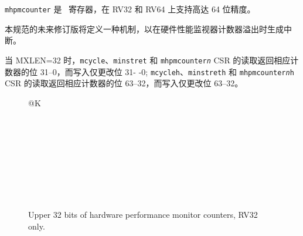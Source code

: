 {\tt mhpmcounter} 是 \warl\ 寄存器，在 RV32 和 RV64 上支持高达 64 位精度。

\iffalse
\begin{commentary}
A future revision of this specification will define a mechanism to generate an
interrupt when a hardware performance monitor counter overflows.
\end{commentary}
\fi

\begin{commentary}
本规范的未来修订版将定义一种机制，以在硬件性能监视器计数器溢出时生成中断。
\end{commentary}

\iffalse
When MXLEN=32, reads of the {\tt mcycle}, {\tt minstret}, and {\tt
mhpmcounter{\em n}} CSRs return bits 31--0 of the corresponding counter, and
writes change only bits 31--0; reads of the {\tt mcycleh}, {\tt minstreth},
and {\tt mhpmcounter{\em n}h} CSRs return bits 63--32 of the corresponding
counter, and writes change only bits 63--32.
\fi

当 MXLEN=32 时，{\tt mcycle}、{\tt minstret} 和 {\tt mhpmcounter{\em n}} CSR 的读取返回相应计数器的位 31--0，而写入仅更改位 31- -0; {\tt mcycleh}、{\tt minstreth} 和 {\tt mhpmcounter{\em n}h} CSR 的读取返回相应计数器的位 63--32，而写入仅更改位 63--32。

\begin{figure}[h!]
{\footnotesize
\begin{center}
\begin{tabular}{@{}K}
 \\ \hline
{} \\ \hline
{} \\ \hline
{} \\ \hline
{} \\ \hline
{}  \\ \hline
{} \\ \hline
{} \\  \\
\end{tabular}
\end{center}
}
\vspace{-0.1in}
\caption{Upper 32 bits of hardware performance monitor counters, RV32 only.}
\end{figure}

